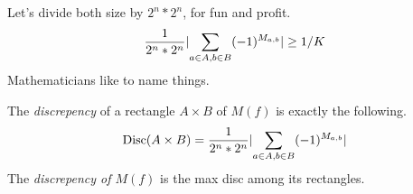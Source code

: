 Let's divide both size by $2^n * 2^n$, for fun and profit.
\[\frac{1}{2^n * 2^n}\lvert\sum_{a \in A, b \in B} (-1)^{M_{a,b}}\rvert \geq 1 / K\]
\pause
Mathematicians like to name things.
\begin{definition}[Discrepency]
The \textit{discrepency} of a rectangle $A \times B$ of $M(f)$ is exactly the following.
\[\text{Disc}(A \times B) = \frac{1}{2^n * 2^n}\lvert\sum_{a \in A, b \in B} (-1)^{M_{a,b}}\rvert\]
The \emph{discrepency of $M(f)$} is the max disc among its rectangles.
\end{definition}